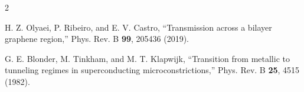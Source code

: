 \begin{thebibliography}{2}

H. Z. Olyaei, P. Ribeiro, and E. V. Castro,
``Transmission across a bilayer graphene region,''
Phys. Rev. B \textbf{99}, 205436 (2019).

G. E. Blonder, M. Tinkham, and M. T. Klapwijk,
``Transition from metallic to tunneling regimes in superconducting microconstrictions,''
Phys. Rev. B \textbf{25}, 4515 (1982).

\end{thebibliography}
